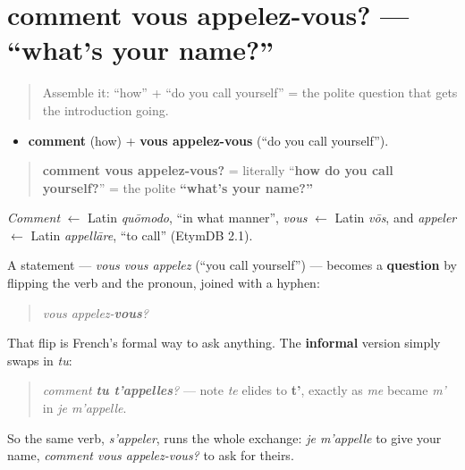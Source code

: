 \section[comment vous appelez-vous?]{comment vous appelez-vous? — \textquotedblleft{}what's your name?\textquotedblright{}}

\label{lesson:FR-C02-comment-vous-appelez-vous}



\begin{quote}
Assemble it: \textquotedblleft{}how\textquotedblright{} + \textquotedblleft{}do you call yourself\textquotedblright{} = the polite question that gets the introduction going.
\end{quote}

\begin{cousinweb}
\begin{itemize}
\raggedright
  \item \textbf{comment} (how) + \textbf{vous appelez-vous} (\textquotedblleft{}do you call yourself\textquotedblright{}).
\end{itemize}

\begin{quote}
\textbf{comment vous appelez-vous?} = literally \textquotedblleft{}\textbf{how do you call yourself?}\textquotedblright{} = the polite \textbf{\textquotedblleft{}what's your name?\textquotedblright{}}
\end{quote}

\emph{Comment} $\leftarrow$ Latin \emph{quōmodo}, \textquotedblleft{}in what manner\textquotedblright{}, \emph{vous} $\leftarrow$ Latin \emph{vōs}, and \emph{appeler} $\leftarrow$ Latin \emph{appellāre}, \textquotedblleft{}to call\textquotedblright{} (EtymDB 2.1).
\end{cousinweb}

\begin{grammarlens}[title={Grammar Lens: asking by inversion}]
A statement — \emph{vous vous appelez} (\textquotedblleft{}you call yourself\textquotedblright{}) — becomes a \textbf{question} by flipping the verb and the pronoun, joined with a hyphen:

\begin{quote}
\emph{vous appelez-\textbf{vous}?}
\end{quote}

That flip is French's formal way to ask anything. The \textbf{informal} version simply swaps in \emph{tu}:

\begin{quote}
\emph{comment \textbf{tu t'appelles}?} — note \emph{te} elides to \textbf{t'}, exactly as \emph{me} became \emph{m'} in \emph{je m'appelle}.
\end{quote}

So the same verb, \emph{s'appeler}, runs the whole exchange: \emph{je m'appelle} to give your name, \emph{comment vous appelez-vous?} to ask for theirs.
\end{grammarlens}


